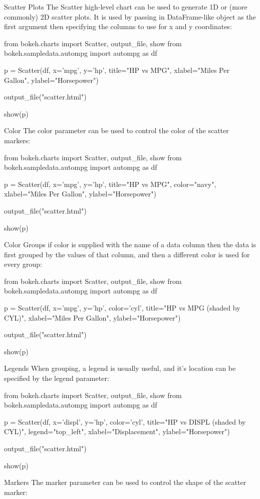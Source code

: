 Scatter Plots
The Scatter high-level chart can be used to generate 1D or (more commonly) 2D scatter plots. It is used by passing in DataFrame-like object as the first argument then specifying the columns to use for x and y coordinates:

from bokeh.charts import Scatter, output_file, show
from bokeh.sampledata.autompg import autompg as df

p = Scatter(df, x='mpg', y='hp', title="HP vs MPG",
            xlabel="Miles Per Gallon", ylabel="Horsepower")

output_file("scatter.html")

show(p)
	
Color
The color parameter can be used to control the color of the scatter markers:

from bokeh.charts import Scatter, output_file, show
from bokeh.sampledata.autompg import autompg as df

p = Scatter(df, x='mpg', y='hp', title="HP vs MPG", color="navy",
            xlabel="Miles Per Gallon", ylabel="Horsepower")

output_file("scatter.html")

show(p)
	
Color Groups
if color is supplied with the name of a data column then the data is first grouped by the values of that column, and then a different color is used for every group:

from bokeh.charts import Scatter, output_file, show
from bokeh.sampledata.autompg import autompg as df

p = Scatter(df, x='mpg', y='hp', color='cyl', title="HP vs MPG (shaded by CYL)",
            xlabel="Miles Per Gallon", ylabel="Horsepower")

output_file("scatter.html")

show(p)
	
Legends
When grouping, a legend is usually useful, and it’s location can be specified by the legend parameter:

from bokeh.charts import Scatter, output_file, show
from bokeh.sampledata.autompg import autompg as df

p = Scatter(df, x='displ', y='hp', color='cyl',
            title="HP vs DISPL (shaded by CYL)", legend="top_left",
            xlabel="Displacement", ylabel="Horsepower")

output_file("scatter.html")

show(p)
	
Markers
The marker parameter can be used to control the shape of the scatter marker:

